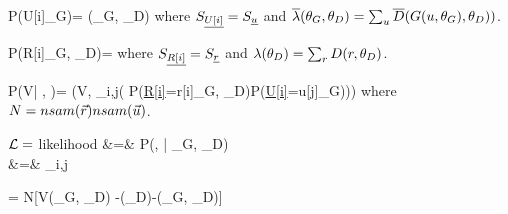 \beq\color{blue}
P(U[i]\cond \theta_G)= 
{\ol{\lam}(\theta_G, \theta_D)}
\eeq
where  $S_{\underline{U[i]}}=S_{\underline{u}}$ and $\overline{\lambda}(\theta_G, \theta_D)=\sum_u\overline{D}(G(u, \theta_G), \theta_D))$.

\beq\color{blue}
P(R[i]\cond \theta_G, \theta_D)= 
\eeq
where $S_{\underline{R[i]}}=S_{\underline{r}}$ and  $\lambda(\theta_D)=\sum_r D(r, \theta_D)$.


\beq\color{blue}
P(V| \vecu,  \vecr)=
\delta(V, \log \prod_{i,j}(
P(\ul{R[i]}=r[i]\cond \theta_G, \theta_D)P(\ul{U[i]}=u[j]\cond \theta_G)))
\eeq
where $N=nsam({\vec{r}})nsam({\vec{u}})$.


${\cal L}=$ likelihood
\beqa
\call&=&
P(\vecr, \vecu| \theta_G, \theta_D)\\
&=&
\prod_{i,j}
\eeqa

\beq
\log \call = N[V(\theta_G, \theta_D)
-\log \lam(\theta_D)-\log \ol{\lam}(\theta_G, \theta_D)]
\eeq





 